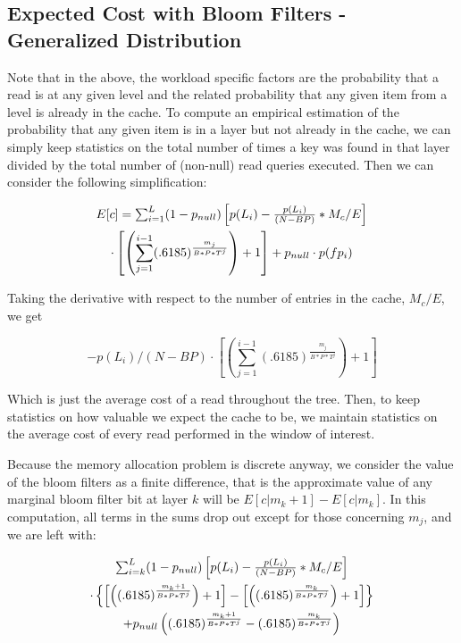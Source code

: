 \documentclass{sig-alternate-05-2015}
\begin{document}
\subsection{Expected Cost with Bloom Filters - Generalized Distribution}

Note that in the above, the workload specific factors are the probability that
a read is at any given level and the related probability that any given item
from a level is already in the cache. To compute an empirical estimation of the
probability that any given item is in a layer but not already in the cache, we
can simply keep statistics on the total number of times a key was found in that
layer divided by the total number of (non-null) read queries executed. Then we
can consider the following simplification:

\begin{multline}
$$E[c] = \sum_{i=1}^{L} (1-p_{null})\left[p(L_i) - \frac{p(L_i)}{(N - BP)} * M_c/E \right]\\ \cdot \left[ \left(\sum_{j=1}^{i-1} (.6185) ^  {\frac{m_j}{B*P*T^j}}\right) +1 \right] + p_{null} \cdot p(fp_i) $$
\end{multline}

Taking the derivative with respect to the number of entries in the cache,
$M_c/E$, we get 

$$
- p(L_i)/(N - BP) \cdot \left[ \left(\sum_{j=1}^{i-1} (.6185) ^  {\frac{m_j}{B*P*T^j}}\right) +1 \right]
$$

Which is just the average cost of a read throughout the tree. Then, to keep
statistics on how valuable we expect the cache to be, we maintain statistics on
the average cost of every read performed in the window of interest.

Because the memory allocation problem is discrete anyway, we consider the value
of the bloom filters as a finite difference, that is the approximate value of
any marginal bloom filter bit at layer $k$ will be $E[c | m_k+1] - E[c | m_k]$.
In this computation, all terms in the sums drop out except for those concerning
$m_j$, and we are left with:

\begin{multline}
$$\sum_{i=k}^{L} (1-p_{null})\left[p(L_i) - \frac{p(L_i)}{(N - BP)} * M_c/E \right] \\ \cdot \left\{ \left[ \left( (.6185) ^  {\frac{m_k+1}{B*P*T^j}}\right) +1 \right] - \left[ \left( (.6185) ^  {\frac{m_k}{B*P*T^j}}\right) +1 \right] \right\} \\+ p_{null}  \left( (.6185) ^  {\frac{m_k+1}{B*P*T^j}} - (.6185) ^  {\frac{m_k}{B*P*T^j}}\right)$$
\end{multline}
\end{document}
